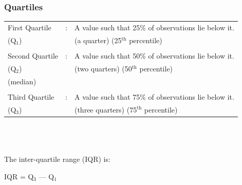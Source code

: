 \documentclass[xcolor=svgnames, compress]{beamer}
\begin{document}

\begin{frame}
\frametitle{Quartiles}

\vspace{0.5cm}

\hspace*{-22.5pt}
\begin{tabular}{L{2.55cm} C{0.12cm} l}
First Quartile	& : &		A value such that 25\% of observations lie below it.	\\
(Q$_{1}$)		&   &		\hspace{2.5cm} \scriptsize{(a quarter)}	\hspace{2cm}	\scriptsize{(25$^{\text{th}}$ percentile)} \\
\hfill\\
Second Quartile	& : &		A value such that 50\% of observations lie below it.	\\
(Q$_{2}$)			&   &		\hspace{2.5cm} \scriptsize{(two quarters)}		\hspace{1.55cm}	\scriptsize{(50$^{\text{th}}$ percentile)} \\
(median)			&   &		\\
\hfill\\
Third Quartile	& : &		A value such that 75\% of observations lie below it.	\\
(Q$_{3}$)		&   &		\hspace{2.5cm} \scriptsize{(three quarters)}	\hspace{1.3cm}	\scriptsize{(75$^{\text{th}}$ percentile)} \\
\end{tabular}
\hfill\\
\hfill\\
\hfill\\

The \alert{inter-quartile range (IQR)} is: \\

\begin{center}
IQR =  Q$_{3}$ --- Q$_{1}$
\end{center}

\end{frame}
\end{document}
